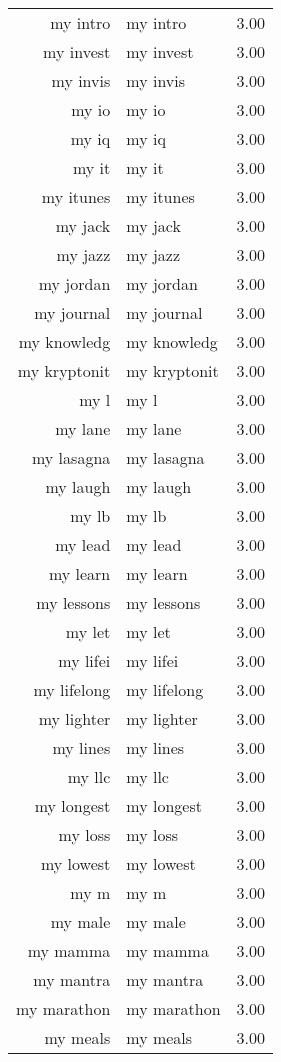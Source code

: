 \begin{table}[ht]
\begin{tabular}{rlr}
  my intro & my intro & 3.00 \\ 
  my invest & my invest & 3.00 \\ 
  my invis & my invis & 3.00 \\ 
  my io & my io & 3.00 \\ 
  my iq & my iq & 3.00 \\ 
  my it & my it & 3.00 \\ 
  my itunes & my itunes & 3.00 \\ 
  my jack & my jack & 3.00 \\ 
  my jazz & my jazz & 3.00 \\ 
  my jordan & my jordan & 3.00 \\ 
  my journal & my journal & 3.00 \\ 
  my knowledg & my knowledg & 3.00 \\ 
  my kryptonit & my kryptonit & 3.00 \\ 
  my l & my l & 3.00 \\ 
  my lane & my lane & 3.00 \\ 
  my lasagna & my lasagna & 3.00 \\ 
  my laugh & my laugh & 3.00 \\ 
  my lb & my lb & 3.00 \\ 
  my lead & my lead & 3.00 \\ 
  my learn & my learn & 3.00 \\ 
  my lessons & my lessons & 3.00 \\ 
  my let & my let & 3.00 \\ 
  my lifei & my lifei & 3.00 \\ 
  my lifelong & my lifelong & 3.00 \\ 
  my lighter & my lighter & 3.00 \\ 
  my lines & my lines & 3.00 \\ 
  my llc & my llc & 3.00 \\ 
  my longest & my longest & 3.00 \\ 
  my loss & my loss & 3.00 \\ 
  my lowest & my lowest & 3.00 \\ 
  my m & my m & 3.00 \\ 
  my male & my male & 3.00 \\ 
  my mamma & my mamma & 3.00 \\ 
  my mantra & my mantra & 3.00 \\ 
  my marathon & my marathon & 3.00 \\ 
  my meals & my meals & 3.00 \\ 

\end{tabular}
\end{table}
